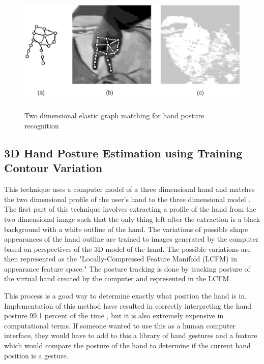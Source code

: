 \documentclass[a4paper,12pt]{report}
\begin{document}
\begin{figure}
\centering
\includegraphics[height = 60mm]{egm.eps}
\caption{Two dimensional elastic graph matching for hand posture recognition}
\end{figure}



\subsection{3D Hand Posture Estimation using Training Contour Variation}

This technique uses a computer model of a three dimensional hand and matches the two dimensional profile of the user's hand to the three dimensional model \cite{3d}. The first part of this technique involves extracting a profile of the hand from the two dimensional image such that the only thing left after the extraction is a black background with a white outline of the hand. The variations of possible shape appearances of the hand outline are trained to images generated by the computer based on perspectives of the 3D model of the hand. The possible variations are then represented as the "Locally-Compressed Feature Manifold (LCFM) in appearance feature space." \cite{3} \cite{4} The posture tracking is done by tracking posture of the virtual hand created by the computer and represented in the LCFM. 

This process is a good way to determine exactly what position the hand is in. Implementation of this method have resulted in correctly interpreting the hand posture 99.1 percent of the time \cite{3d}, but it is also extremely expensive in computational terms. If someone wanted to use this as a human computer interface, they would have to add to this a library of hand gestures and a feature which would compare the posture of the hand to determine if the current hand position is a gesture. 
\end{document}
